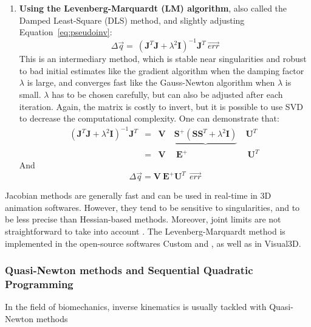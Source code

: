 \begin{enumerate}[itemsep=0em, topsep=0em, leftmargin=*]
    \item \textbf{Using the Levenberg-Marquardt (LM) algorithm}, also called the Damped Least-Square (DLS) method, and slightly adjusting Equation~\ref{eq:pseudoinv}:
    \begin{equation}
        \Delta \overrightarrow{q} = \ (\textbf{J}^T \textbf{J} + \lambda^2 \textbf{I})^{-1} \textbf{J}^T \ \overrightarrow{err}
    \end{equation} 
    This is an intermediary method, which is stable near singularities and robust to bad initial estimates like the gradient algorithm when the damping factor $\lambda$ is large, and converges fast like the Gauss-Newton algorithm when $\lambda$ is small. $\lambda$ has to be chosen carefully, but can also be adjusted after each iteration. Again, the matrix is costly to invert, but it is possible to use SVD to decrease the computational complexity. One can demonstrate that:
     \begin{equation}
        \begin{array}{rlccccc} 
            (\textbf{J}^T \textbf{J} + \lambda^2 \textbf{I})^{-1} \textbf{J}^T &=& \textbf{V} \ & \underbrace{\textbf{S}^{+} (\textbf{S} \textbf{S}^T+\lambda^2 \textbf{I})} \  & \textbf{U}^T \ \ \\
            & = & \textbf{V} & \ \textbf{E}^{+} & \  \textbf{U}^T
        \end{array}
     \end{equation}
    And 
      \begin{equation}
        \Delta \overrightarrow{q} =  \textbf{V} \ \textbf{E}^{+} \textbf{U}^T \ \ \overrightarrow{err} 
      \end{equation}
\end{enumerate}

Jacobian methods are generally fast and can be used in real-time in 3D animation softwares. However, they tend to be sensitive to singularities, and to be less precise than Hessian-based methods. Moreover, joint limits are not straightforward to take into account \cite{Aristidou2018}. The Levenberg-Marquardt method is implemented in the open-source softwares Custom and \cite{Pinocchio,Carpentier2019}, as well as in Visual3D. 


\subsubsection{Quasi-Newton methods and Sequential Quadratic Programming}

In the field of biomechanics, inverse kinematics is usually tackled with Quasi-Newton methods


